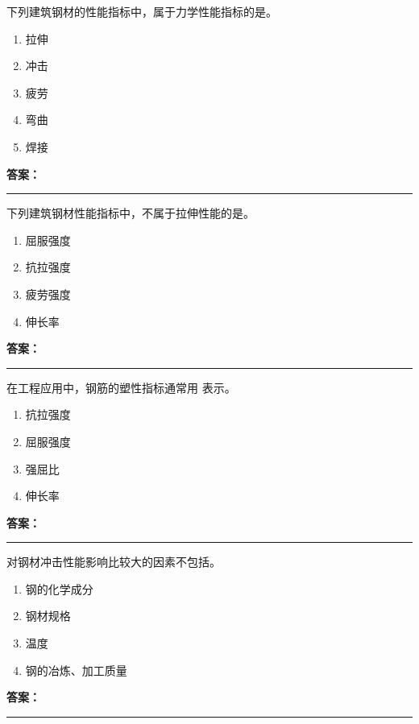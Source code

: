 \documentclass[UTF8,fontset=fandol,11pt]{ctexart}
\newcommand{\answerline}{\textcolor{answerred}{\rule{2.4cm}{0.7pt}}}
\begin{document}
\vspace{0.2em}

\begin{quizbox}[title={第 6 题}]
下列建筑钢材的性能指标中，属于力学性能指标的是。\\
\begin{enumerate}[label=\Alph*.]
\item 拉伸
\item 冲击
\item 疲劳
\item 弯曲
\item 焊接
\end{enumerate}
\textbf{\textcolor{answerred}{答案：}} \answerline
\end{quizbox}

\vspace{0.2em}

\begin{quizbox}[title={第 7 题}]
下列建筑钢材性能指标中，不属于拉伸性能的是。\\
\begin{enumerate}[label=\Alph*.]
\item 屈服强度
\item 抗拉强度
\item 疲劳强度
\item 伸长率
\end{enumerate}
\textbf{\textcolor{answerred}{答案：}} \answerline
\end{quizbox}

\vspace{0.2em}

\begin{quizbox}[title={第 8 题}]
在工程应用中，钢筋的塑性指标通常用 表示。\\
\begin{enumerate}[label=\Alph*.]
\item 抗拉强度
\item 屈服强度
\item 强屈比
\item 伸长率
\end{enumerate}
\textbf{\textcolor{answerred}{答案：}} \answerline
\end{quizbox}

\vspace{0.2em}

\begin{quizbox}[title={第 9 题}]
对钢材冲击性能影响比较大的因素不包括。\\
\begin{enumerate}[label=\Alph*.]
\item 钢的化学成分
\item 钢材规格
\item 温度
\item 钢的冶炼、加工质量
\end{enumerate}
\textbf{\textcolor{answerred}{答案：}} \answerline
\end{quizbox}
\end{document}
